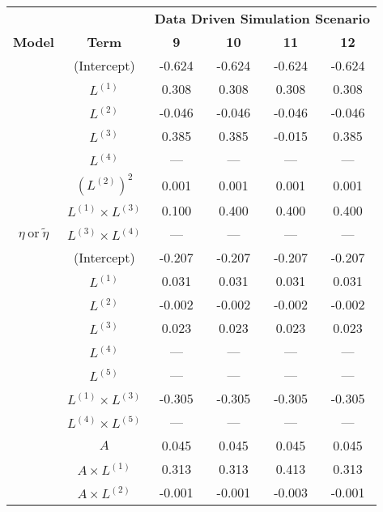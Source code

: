 \begin{sidewaystable}
    \footnotesize
\begin{minipage}[t]{0.5\textwidth}
\centering

\begin{tabular}[t]{>{}ccccc>{}c}
\hline
\multicolumn{1}{c}{\textbf{ }} & \multicolumn{1}{c}{\textbf{ }} & \multicolumn{4}{c}{\textbf{Data Driven Simulation Scenario}} \\
\cmidrule{3-6}
\textbf{Model} & \textbf{Term} & \textbf{9} & \textbf{10} & \textbf{11} & \textbf{12}\\
\hline
 & (Intercept) & -0.624 & -0.624 & -0.624 & -0.624\\
\cmidrule{2-6}
 & $L^{(1)}$ & 0.308 & 0.308 & 0.308 & 0.308\\
\cmidrule{2-6}
 & $L^{(2)}$ & -0.046 & -0.046 & -0.046 & -0.046\\
\cmidrule{2-6}
 & $L^{(3)}$ & 0.385 & 0.385 & -0.015 & 0.385\\
\cmidrule{2-6}
 & $L^{(4)}$ & --- & --- & --- & ---\\
\cmidrule{2-6}
 & $(L^{(2)})^2$ & 0.001 & 0.001 & 0.001 & 0.001\\
\cmidrule{2-6}
 & $L^{(1)} \times L^{(3)}$ & 0.100 & 0.400 & 0.400 & 0.400\\
\cmidrule{2-6}
\multirow{-8}{*}{\centering\arraybackslash $\eta~\text{or}~\tilde\eta$} & $L^{(3)} \times L^{(4)}$ & --- & --- & --- & ---\\
\cmidrule{1-6}
 & (Intercept) & -0.207 & -0.207 & -0.207 & -0.207\\
\cmidrule{2-6}
 & $L^{(1)}$ & 0.031 & 0.031 & 0.031 & 0.031\\
\cmidrule{2-6}
 & $L^{(2)}$ & -0.002 & -0.002 & -0.002 & -0.002\\
\cmidrule{2-6}
 & $L^{(3)}$ & 0.023 & 0.023 & 0.023 & 0.023\\
\cmidrule{2-6}
 & $L^{(4)}$ & --- & --- & --- & ---\\
\cmidrule{2-6}
 & $L^{(5)}$ & --- & --- & --- & ---\\
\cmidrule{2-6}
 & $L^{(1)} \times L^{(3)}$ & -0.305 & -0.305 & -0.305 & -0.305\\
\cmidrule{2-6}
 & $L^{(4)} \times L^{(5)}$ & --- & --- & --- & ---\\
\cmidrule{2-6}
 & $A$ & 0.045 & 0.045 & 0.045 & 0.045\\
\cmidrule{2-6}
 & $A \times L^{(1)}$ & 0.313 & 0.313 & 0.413 & 0.313\\
\cmidrule{2-6}
 & $A \times L^{(2)}$ & -0.001 & -0.001 & -0.003 & -0.001\\

\end{tabular}
\end{minipage}
\end{sidewaystable}
